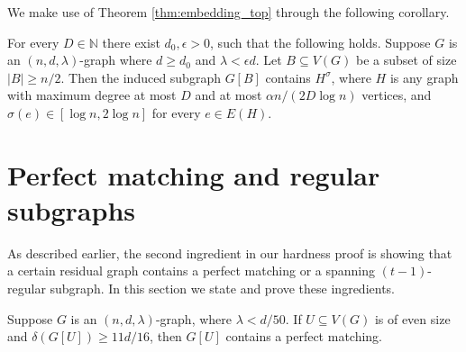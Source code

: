 \documentclass[11pt]{article}
\begin{document}
We make use of Theorem \ref{thm:embedding_top} through the following corollary.

\begin{corollary} \label{cor:embedding_top}
For every $D \in \mathbb{N}$ there exist $d_0, \epsilon > 0$, such that the following holds. Suppose $G$ is an $(n,d,\lambda)$-graph where $d \ge d_0$ and $\lambda < \epsilon d$. Let $B \subseteq V(G)$ be a subset of size $|B| \ge n/2$. Then the induced subgraph $G[B]$ contains $H^{\sigma}$, where $H$ is any graph with maximum degree at most $D$ and at most $\alpha n / (2D \log n)$ vertices, and $\sigma(e) \in [\log n, 2 \log n]$ for every $e \in E(H)$.
\end{corollary}



\section{Perfect matching and regular subgraphs}
\label{sec:matching-machinery}
As described earlier, the second ingredient in our hardness proof is showing that a certain residual graph contains a perfect matching or a spanning $(t-1)$-regular subgraph. In this section we state and prove these ingredients.

\begin{lemma}\label{thm:perfect-matching}
Suppose $G$ is an $(n, d, \lambda)$-graph, where $\lambda < d/50$. If $U \subseteq V(G)$ is of even size and $\delta(G[U]) \ge 11d/16$, then $G[U]$ contains a perfect matching.
\end{lemma}
\end{document}
